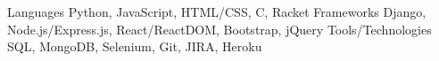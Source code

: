 
\begin{cvskills}
  \cvskill
    {Languages} %
    {Python, JavaScript, HTML/CSS, C, Racket} %
  \cvskill
    {Frameworks} %
    {Django, Node.js/Express.js, React/ReactDOM, Bootstrap, jQuery} %
  \cvskill
    {Tools/Technologies} %
    {SQL, MongoDB, Selenium, Git, JIRA, Heroku} %
\end{cvskills}
